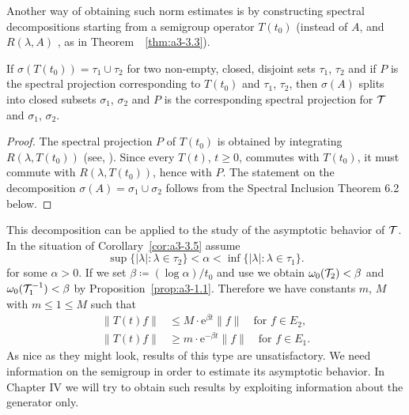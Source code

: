 Another way of obtaining such norm estimates is by constructing spectral decompositions starting from a semigroup operator $T(t_{0})$ (instead of $A$, and $R(\lambda,A)$ \resp, as in Theorem~~\ref{thm:a3-3.3}).
\begin{corollary}\label{cor:a3-3.5}
If $\sigma(T(t_{0})) = \tau_{1} \cup \tau_{2}$ for two non-empty, closed, disjoint sets $\tau_{1}$, $\tau_{2}$ and if $P$ is the spectral projection corresponding to $T(t_{0})$ and $\tau_{1}$, $\tau_{2}$, then $\sigma(A)$ splits into closed subsets $\sigma_{1}$, $\sigma_{2}$ and $P$ is the corresponding spectral projection for $\mathcal{T}$ and $\sigma_{1}$, $\sigma_{2}$.
\end{corollary}
\begin{proof}
The spectral projection $P$ of $T(t_{0})$ is obtained by integrating $R(\lambda,T(t_{0}))$ (see, \eg \citet[Section VII.3]{dunfordschwartz:1958}).
Since every $T(t)$, $t \geq 0$, commutes with $T(t_{0})$, it must commute with $R(\lambda,T(t_{0}))$, hence with $P$.
The statement on the decomposition $\sigma(A) = \sigma_{1} \cup \sigma_{2}$ follows from the Spectral Inclusion Theorem 6.2 below.
\end{proof}
This decomposition can be applied to the study of the asymptotic behavior of $\mathcal{T}$. In the situation of Corollary~\ref{cor:a3-3.5} assume
\[
\sup \{|\lambda| \colon \lambda \in \tau_{2}\} < \alpha < \inf \{|\lambda| \colon \lambda \in \tau_{1}\} .
\]
for some $\alpha > 0$. If we set $\beta \coloneqq (\log\alpha)/t_{0}$ and use \citet[Chap.I, Theorem~6.5]{pazy:1983} we obtain $\omega_{0}(\mathcal{T}_{2}) < \beta$ and $\omega_{0}(\mathcal{T}_{1}^{-1}) < \beta$ by Proposition~\ref{prop:a3-1.1}.
Therefore we have constants $m$, $M$ with $m \le 1 \le M $ such that
\begin{align*}
	\|T(t)f\| &\leq M \cdot \mathrm{e}^{\beta t}\|f\| \quad \text{for } f \in E_{2} , \\
	\|T(t)f\| &\geq m \cdot \mathrm{e}^{-\beta t}\|f\| \quad \text{for } f \in E_{1} .
\end{align*}
As nice as they might look, results of this type are unsatisfactory. We need information on the semigroup in order to estimate its asymptotic behavior.
In Chapter IV we will try to obtain such results by exploiting information about the generator only.
